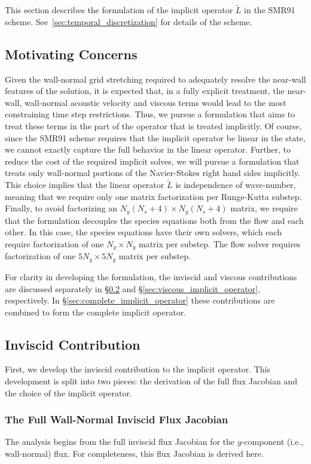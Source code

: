 This section describes the formulation of the implicit operator
$\tilde{L}$ in the SMR91 scheme.  See~\ref{sec:temporal_discretization}
for details of the scheme.

\subsection{Motivating Concerns}
Given the wall-normal grid stretching required to adequately resolve
the near-wall features of the solution, it is expected that, in a
fully explicit treatment, the near-wall, wall-normal acoustic velocity
and viscous terms would lead to the most constraining time step
restrictions.  Thus, we pursue a formulation that aims to treat these
terms in the part of the operator that is treated implicitly.  Of
course, since the SMR91 scheme requires that the implicit operator be
linear in the state, we cannot exactly capture the full behavior in
the linear operator.  Further, to reduce the cost of the required
implicit solves, we will pursue a formulation that treats only
wall-normal portions of the Navier-Stokes right hand sides implicitly.
This choice implies that the linear operator $\tilde{L}$ is
independence of wave-number, meaning that we require only one matrix
factorization per Runge-Kutta substep.  Finally, to avoid factorizing
an $N_y (N_s + 4) \times N_y (N_s + 4)$ matrix, we require that the
formulation decouples the species equations both from the flow and
each other.  In this case, the species equations have their own
solvers, which each require factorization of one $N_y \times N_y$
matrix per substep.  The flow solver requires factorization of one $5
N_y \times 5 N_y$ matrix per substep.

For clarity in developing the formulation, the inviscid and viscous
contributions are discussed separately in
\S\ref{sec:inviscid_implicit_operator} and
\S\ref{sec:viscous_implicit_operator}, respectively.  In
\S\ref{sec:complete_implicit_operator} these contributions are combined
to form the complete implicit operator.

\subsection{Inviscid Contribution}
\label{sec:inviscid_implicit_operator}
First, we develop the inviscid contribution to the implicit operator.
This development is split into two pieces: the derivation of the full
flux Jacobian and the choice of the implicit operator.

\subsubsection{The Full Wall-Normal Inviscid Flux Jacobian}
The analysis begins from the full inviscid flux Jacobian for the
$y$-component (i.e., wall-normal) flux.  For completeness, this flux
Jacobian is derived here.

